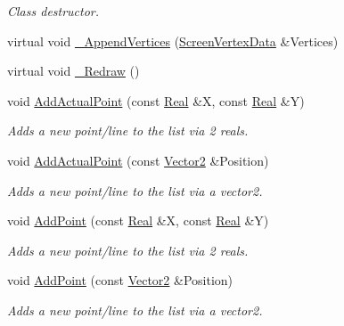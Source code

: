\begin{DoxyCompactItemize}
\begin{DoxyCompactList}\small\item\em Class destructor. \item\end{DoxyCompactList}\item 
virtual void \hyperlink{classMezzanine_1_1UI_1_1LineList_a847863aa5b36f1bf34181ff7b48de81d}{\_\-AppendVertices} (\hyperlink{classMezzanine_1_1UI_1_1ScreenVertexData}{ScreenVertexData} \&Vertices)
\item 
virtual void \hyperlink{classMezzanine_1_1UI_1_1LineList_a5801106416279f51baa81934fa8d4083}{\_\-Redraw} ()
\item 
void \hyperlink{classMezzanine_1_1UI_1_1LineList_a78c3f9e972886851cbe877c8cde4e027}{AddActualPoint} (const \hyperlink{namespaceMezzanine_a726731b1a7df72bf3583e4a97282c6f6}{Real} \&X, const \hyperlink{namespaceMezzanine_a726731b1a7df72bf3583e4a97282c6f6}{Real} \&Y)
\begin{DoxyCompactList}\small\item\em Adds a new point/line to the list via 2 reals. \item\end{DoxyCompactList}\item 
void \hyperlink{classMezzanine_1_1UI_1_1LineList_a9f457889822f8c236d2e0cf7fccd8aeb}{AddActualPoint} (const \hyperlink{classMezzanine_1_1Vector2}{Vector2} \&Position)
\begin{DoxyCompactList}\small\item\em Adds a new point/line to the list via a vector2. \item\end{DoxyCompactList}\item 
void \hyperlink{classMezzanine_1_1UI_1_1LineList_a6f689d10188e5973033fe7448ac7c68d}{AddPoint} (const \hyperlink{namespaceMezzanine_a726731b1a7df72bf3583e4a97282c6f6}{Real} \&X, const \hyperlink{namespaceMezzanine_a726731b1a7df72bf3583e4a97282c6f6}{Real} \&Y)
\begin{DoxyCompactList}\small\item\em Adds a new point/line to the list via 2 reals. \item\end{DoxyCompactList}\item 
void \hyperlink{classMezzanine_1_1UI_1_1LineList_a40a814e86853fed53fc1bf4a7bde5e69}{AddPoint} (const \hyperlink{classMezzanine_1_1Vector2}{Vector2} \&Position)
\begin{DoxyCompactList}\small\item\em Adds a new point/line to the list via a vector2. \item\end{DoxyCompactList}\item 

\end{DoxyCompactItemize}
